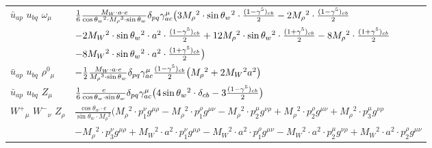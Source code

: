\begin{center}
\begin{tabular}{|l|l|}
$\bar{u}{}_{a p }$ \phantom{-} $u{}_{b q }$ \phantom{-} $\omega{}_{\mu }$ \phantom{-}  &
	$\frac{1}{6}\frac{ M_W \cdot a \cdot e}{ \cos{\theta}_w{}^2  \cdot M_\rho{}^3  \cdot \sin{\theta}_w}\delta_{p q} \gamma_{a c}^\mu \big(3 M_\rho{}^2 \cdot  \sin{\theta}_w{}^2 \cdot {(1-\gamma^5)_{c b}\over 2} -2 M_\rho{}^2 \cdot {(1-\gamma^5)_{c b}\over 2} $ \\[2mm]
  & $-2 M_W{}^2 \cdot  \sin{\theta}_w{}^2 \cdot  a{}^2 \cdot {(1-\gamma^5)_{c b}\over 2} +12 M_\rho{}^2 \cdot  \sin{\theta}_w{}^2 \cdot {(1+\gamma^5)_{c b}\over 2} -8 M_\rho{}^2 \cdot {(1+\gamma^5)_{c b}\over 2} $ \\[2mm]
  & $-8 M_W{}^2 \cdot  \sin{\theta}_w{}^2 \cdot  a{}^2 \cdot {(1+\gamma^5)_{c b}\over 2} \big)$\\[2mm]
$\bar{u}{}_{a p }$ \phantom{-} $u{}_{b q }$ \phantom{-} $\rho^0{}_{\mu }$ \phantom{-}  &
	$-\frac{1}{2}\frac{ M_W \cdot a \cdot e}{ M_\rho{}^3  \cdot \sin{\theta}_w}\delta_{p q} \gamma_{a c}^\mu {(1-\gamma^5)_{c b}\over 2} \big( M_\rho{}^2 +2 M_W{}^2  a{}^2 \big)$\\[2mm]
$\bar{u}{}_{a p }$ \phantom{-} $u{}_{b q }$ \phantom{-} ${Z}_{\mu }$ \phantom{-}  &
	$\frac{1}{6}\frac{ e}{ \cos{\theta}_w \cdot \sin{\theta}_w}\delta_{p q} \gamma_{a c}^\mu \big(4 \sin{\theta}_w{}^2 \cdot \delta_{c b} -3{(1-\gamma^5)_{c b}\over 2} \big)$\\[2mm]
$W^+{}_{\mu }$ \phantom{-} $W^-{}_{\nu }$ \phantom{-} ${Z}_{\rho }$ \phantom{-}  &
	$\frac{ \cos{\theta}_w \cdot e}{ \sin{\theta}_w \cdot M_\rho{}^2 }\big( M_\rho{}^2 \cdot p_1^\nu g^{\mu \rho} - M_\rho{}^2 \cdot p_1^\rho g^{\mu \nu} - M_\rho{}^2 \cdot p_2^\mu g^{\nu \rho} + M_\rho{}^2 \cdot p_2^\rho g^{\mu \nu} + M_\rho{}^2 \cdot p_3^\mu g^{\nu \rho} $ \\[2mm]
  & $- M_\rho{}^2 \cdot p_3^\nu g^{\mu \rho} + M_W{}^2 \cdot  a{}^2 \cdot p_1^\nu g^{\mu \rho} - M_W{}^2 \cdot  a{}^2 \cdot p_1^\rho g^{\mu \nu} - M_W{}^2 \cdot  a{}^2 \cdot p_2^\mu g^{\nu \rho} + M_W{}^2 \cdot  a{}^2 \cdot p_2^\rho g^{\mu \nu} $\\ \hline
\end{tabular}


\end{center}
